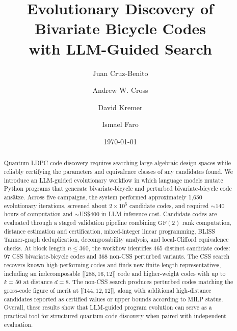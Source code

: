 \documentclass[aps,prxquantum,twocolumn,superscriptaddress,nofootinbib]{revtex4-2}
\newcommand{\dblbrk}[1]{\ensuremath{\lbrack\!\lbrack #1 \rbrack\!\rbrack}}
\newcommand{\code}[1]{\dblbrk{#1}}
\begin{document}
\title{Evolutionary Discovery of Bivariate Bicycle Codes\\with LLM-Guided Search}

\author{Juan Cruz-Benito}
\author{Andrew W. Cross}
\author{David Kremer}
\author{Ismael Faro}

\date{\today}

\begin{abstract}
Quantum LDPC code discovery requires searching large algebraic design spaces while reliably certifying the parameters and equivalence classes of any candidates found.
We introduce an LLM-guided evolutionary workflow in which language models mutate Python programs that generate bivariate-bicycle and perturbed bivariate-bicycle code ansätze.
Across five campaigns, the system performed approximately 1{,}650 evolutionary iterations, screened about $2 \times 10^5$ candidate codes, and required ${\sim}140$ hours of computation and ${\sim}$US\$400 in LLM inference cost.
Candidate codes are evaluated through a staged validation pipeline combining $\mathrm{GF}(2)$ rank computation, distance estimation and certification, mixed-integer linear programming, BLISS Tanner-graph deduplication, decomposability analysis, and local-Clifford equivalence checks.
At block length $n \leq 360$, the workflow identifies 465 distinct candidate codes: 97 CSS bivariate-bicycle codes and 368 non-CSS perturbed variants.
The CSS search recovers known high-performing codes and finds new finite-length representatives, including an indecomposable $\code{288,16,12}$ code and higher-weight codes with up to $k = 50$ at distance $d = 8$.
The non-CSS search produces perturbed codes matching the gross-code figure of merit at $\code{144,12,12}$, along with additional high-distance candidates reported as certified values or upper bounds according to MILP status.
Overall, these results show that LLM-guided program evolution can serve as a practical tool for structured quantum-code discovery when paired with independent evaluation.
\end{abstract}

\maketitle
\end{document}
